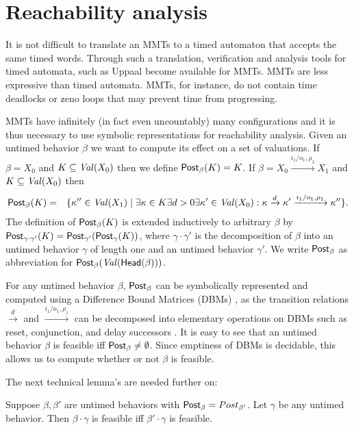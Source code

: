 \iflong
\section{Reachability analysis}

It is not difficult to translate an MMTs to a timed automaton \cite{AD94,BengtssonY03} that accepts the same timed words.
Through such a translation, verification and analysis tools for timed automata, such as Uppaal \cite{Uppaal4.0}
become available for MMTs.
MMTs are less expressive than timed automata. MMTs, for instance, do not contain time deadlocks or zeno loops that
may prevent time from progressing.

MMTs have infinitely (in fact even uncountably) many configurations and it is thus necessary to use symbolic representations
for reachability analysis. Given an untimed behavior $\beta$ we want to compute its effect on a set of valuations. 
If $\beta =X_0$ and $K \subseteq\mathit{Val}({X_0})$ then we define $\mathsf{Post}_{\beta}(K) = K$.
If $\beta = X_0 \xrightarrow{i_1/o_1, \rho_1} X_1$ and
$K \subseteq\mathit{Val}({X_0})$ then
\begin{eqnarray*}
\mathsf{Post}_{\beta}(K) & = & \{ \kappa'' \in\mathit{Val}({X_1}) \mid \exists \kappa \in K \exists d >0 \exists \kappa' \in\mathit{Val}({X_0}) :
 \kappa \xrightarrow{d} \kappa' \xrightarrow{i_1/o_1, \rho_1} \kappa'' \}.
\end{eqnarray*}
The definition of $\mathsf{Post}_{\beta}(K)$ is extended inductively to arbitrary $\beta$ by 
$\mathsf{Post}_{\gamma \cdot \gamma'}(K) = \mathsf{Post}_{\gamma'} (\mathsf{Post}_{\gamma}(K))$, where $\gamma \cdot \gamma'$ is the decomposition of
$\beta$ into an untimed behavior $\gamma$ of length one and an untimed behavior $\gamma'$.
We write $\mathsf{Post}_{\beta}$ as abbreviation for $\mathsf{Post}_{\beta}(\mathit{Val}({\mathsf{Head}({\beta})}))$.

For any untimed behavior $\beta$, $\mathsf{Post}_{\beta}$ can be symbolically represented and computed using a Difference Bound Matrices (DBMs)
 \cite{Di89},  as the transition relations $\xrightarrow{d}$ and $\xrightarrow{i_1/o_1, \rho_1}$ can be decomposed 
into elementary operations on DBMs such as reset, conjunction, and delay successors \cite{BengtssonY03}.
%
It is easy to see that an untimed behavior $\beta$ is feasible iff $\mathsf{Post}_{\beta} \neq \emptyset$.
Since emptiness of DBMs is decidable, this allows us to compute whether or not $\beta$ is feasible.

The next technical lemma's are needed further on:

\begin{lemma}
\label{lemma: feasibility concatenation}
Suppose $\beta, \beta'$ are untimed behaviors with
$\mathsf{Post}_{\beta} = Post_{\beta'}$. Let $\gamma$ be any untimed behavior.
Then $\beta \cdot \gamma$ is feasible iff $\beta' \cdot \gamma$ is feasible.
\end{lemma}


